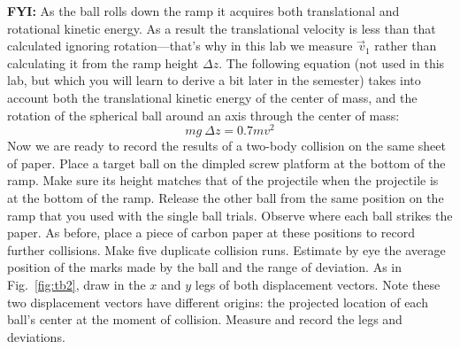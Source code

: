 {\bf FYI:}  As the ball rolls down the ramp it acquires both translational
       and rotational kinetic energy.  As a result the translational
velocity is less than that calculated ignoring rotation---that's why
in this lab we measure $\vec{\,v}_1$ rather than calculating it from
the ramp height $\Delta z$. The following equation (not used in this lab, but which you
       will learn to derive a bit later in the semester) takes into
       account both the translational kinetic energy of the center of
       mass, and the rotation of the spherical ball around an axis
       through the center of mass:
\[
mg \: \Delta z = 0.7 m v^{2}
\]
     Now we are ready to record the results of a two-body collision on
the same sheet of paper.  Place a target ball on the dimpled screw platform
at the bottom of the ramp.  Make sure its height matches that of the projectile
when the projectile is at the bottom of the ramp.
Release the other ball from the same position on
the ramp that you used with the single ball trials.
Observe where each ball strikes the paper.  As before, place a
piece of carbon paper at these positions to record further collisions.
Make five duplicate collision runs.
Estimate by eye the average
position of the marks made by the ball and the range of deviation.  
As in Fig.~\ref{fig:tb2}, draw in the $x$ and $y$ legs of both displacement
vectors.  Note  these two displacement vectors have different origins:
the projected location of each ball's center at the moment of collision.
Measure and record the legs and deviations.


